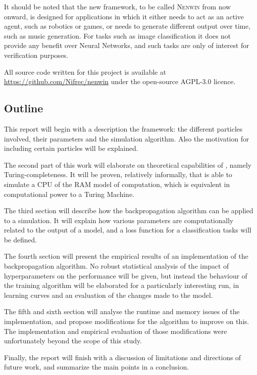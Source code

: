 It should be noted that the new framework, to be called \textsc{Nenwin} from now onward, 
is designed for applications in which it either needs to act as an active agent, 
such as robotics or games, 
or needs to generate different output over time, 
such as music generation. 
For tasks such as image classification it does not provide any benefit over Neural Networks, 
and such tasks are only of interest for verification purposes.

All source code written for this project is available at \url{https://github.com/Nifrec/nenwin} under the open-source AGPL-3.0 licence\cite{AGPL_3}.

\subsection{Outline}
This report will begin with a description the \nenwin framework: 
the different particles involved, their parameters and the simulation algorithm. 
Also the motivation for including certain particles will be explained.

The second part of this work will elaborate on theoretical capabilities of \nenwin, namely Turing-completeness.
It will be proven, relatively informally, that \nenwin is able to simulate a CPU of the RAM model of computation,
which is equivalent in computational power to a Turing Machine.

The third section will describe how the backpropagation algorithm can be applied to a \nenwin simulation.
It will explain how various parameters are computationally related to the output of a \nenwin model,
and a loss function for a classification tasks will be defined.

The fourth section will present the empirical results of an implementation of the backpropagation algorithm.
No robust statistical analysis of the impact of hyperparameters on the performance will be given,
but instead the behaviour of the training algorithm will be elaborated for a particularly interesting run,
in learning curves and an evaluation of the changes made to the model.

The fifth and sixth section will analyse the runtime and memory issues of the implementation, 
and propose modifications for the algorithm to improve on this.
The implementation and empirical evaluation of those modifications were
unfortunately beyond the scope of this study.

Finally, the report will finish with a discussion of limitations and directions of future work,
and summarize the main points in a conclusion.


